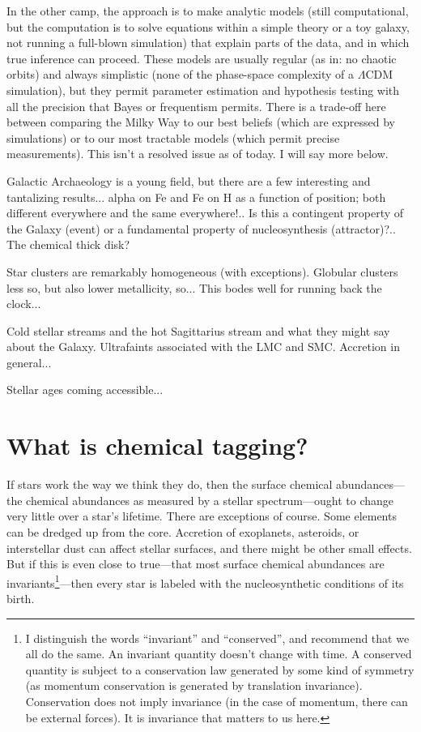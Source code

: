 \documentclass[11pt, letterpaper]{article}
\begin{document}

In the other camp, the approach is to make analytic models (still
computational, but the computation is to solve equations within a
simple theory or a toy galaxy, not running a full-blown simulation)
that explain parts of the data, and in which true inference can
proceed. These models are usually regular (as in: no chaotic orbits)
and always simplistic (none of the phase-space complexity of a
$\Lambda$CDM simulation), but they permit parameter estimation and
hypothesis testing with all the precision that Bayes or frequentism
permits. There is a trade-off here between comparing the Milky Way to
our best beliefs (which are expressed by simulations) or to our most
tractable models (which permit precise measurements). This isn't a
resolved issue as of today. I will say more below.

Galactic Archaeology is a young field, but there are a few interesting
and tantalizing results... alpha on Fe and Fe on H as a function of
position; both different everywhere and the same everywhere!.. Is this
a contingent property of the Galaxy (event) or a fundamental property
of nucleosynthesis (attractor)?.. The chemical thick disk?

Star clusters are remarkably homogeneous (with exceptions). Globular
clusters less so, but also lower metallicity, so... This bodes well
for running back the clock...

Cold stellar streams and the hot Sagittarius stream and what they
might say about the Galaxy. Ultrafaints associated with the LMC and
SMC. Accretion in general...

Stellar ages coming accessible...

\section{What is chemical tagging?}

If stars work the way we think they do, then the surface chemical
abundances---the chemical abundances as measured by a stellar
spectrum---ought to change very little over a star's lifetime. There
are exceptions of course. Some elements can be dredged up from the
core. Accretion of exoplanets, asteroids, or interstellar dust can
affect stellar surfaces, and there might be other small effects. But
if this is even close to true---that most surface chemical abundances
are invariants\footnote{I distinguish the words ``invariant'' and
  ``conserved'', and recommend that we all do the same. An invariant
  quantity doesn't change with time. A conserved quantity is subject
  to a conservation law generated by some kind of symmetry (as
  momentum conservation is generated by translation
  invariance). Conservation does not imply invariance (in the case of
  momentum, there can be external forces). It is invariance that
  matters to us here.}---then every star is labeled with the
nucleosynthetic conditions of its birth.
\end{document}
